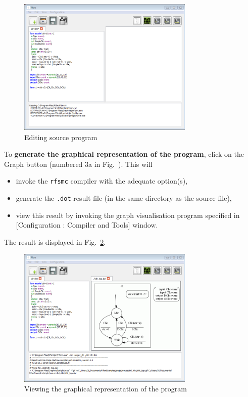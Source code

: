 \begin{figure}[h]
  \centering
  \includegraphics[width=0.75\textwidth]{figs/gui/source}
  \caption{Editing source program}
  \label{fig:first-program}
\end{figure}

\medskip
To \textbf{generate the graphical representation of the program}, click on the \textsf{Graph} button
(numbered \textsf{3a} in Fig.~\pageref{fig:main-window}). This will
\begin{itemize}
\item invoke the \verb|rfsmc| compiler with the adequate option(s),
\item generate the \texttt{.dot} result file (in the same directory as the source file),
\item view this result by invoking the graph visualisation program specified in 
  [\textsf{Configuration : Compiler and Tools}] window.
\end{itemize}

The result is displayed in Fig.~\ref{fig:make-dot}.

\begin{figure}[h]
  \centering
  \includegraphics[width=0.75\textwidth]{figs/gui/make-dot}
  \caption{Viewing the graphical representation of the program}
  \label{fig:make-dot}
\end{figure}

